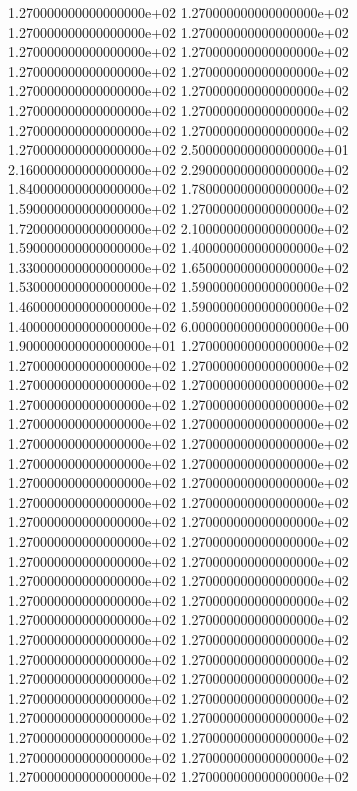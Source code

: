 1.270000000000000000e+02 1.270000000000000000e+02 1.270000000000000000e+02 1.270000000000000000e+02 1.270000000000000000e+02 1.270000000000000000e+02 1.270000000000000000e+02 1.270000000000000000e+02 1.270000000000000000e+02 1.270000000000000000e+02 1.270000000000000000e+02 1.270000000000000000e+02 1.270000000000000000e+02 1.270000000000000000e+02 1.270000000000000000e+02 2.500000000000000000e+01 2.160000000000000000e+02 2.290000000000000000e+02 1.840000000000000000e+02 1.780000000000000000e+02 1.590000000000000000e+02 1.270000000000000000e+02 1.720000000000000000e+02 2.100000000000000000e+02 1.590000000000000000e+02 1.400000000000000000e+02 1.330000000000000000e+02 1.650000000000000000e+02 1.530000000000000000e+02 1.590000000000000000e+02 1.460000000000000000e+02 1.590000000000000000e+02 1.400000000000000000e+02 6.000000000000000000e+00 1.900000000000000000e+01 1.270000000000000000e+02 1.270000000000000000e+02 1.270000000000000000e+02 1.270000000000000000e+02 1.270000000000000000e+02 1.270000000000000000e+02 1.270000000000000000e+02 1.270000000000000000e+02 1.270000000000000000e+02 1.270000000000000000e+02 1.270000000000000000e+02 1.270000000000000000e+02 1.270000000000000000e+02 1.270000000000000000e+02 1.270000000000000000e+02 1.270000000000000000e+02 1.270000000000000000e+02 1.270000000000000000e+02 1.270000000000000000e+02 1.270000000000000000e+02 1.270000000000000000e+02 1.270000000000000000e+02 1.270000000000000000e+02 1.270000000000000000e+02 1.270000000000000000e+02 1.270000000000000000e+02 1.270000000000000000e+02 1.270000000000000000e+02 1.270000000000000000e+02 1.270000000000000000e+02 1.270000000000000000e+02 1.270000000000000000e+02 1.270000000000000000e+02 1.270000000000000000e+02 1.270000000000000000e+02 1.270000000000000000e+02 1.270000000000000000e+02 1.270000000000000000e+02 1.270000000000000000e+02 1.270000000000000000e+02 1.270000000000000000e+02 1.270000000000000000e+02 1.270000000000000000e+02 1.270000000000000000e+02 1.270000000000000000e+02

